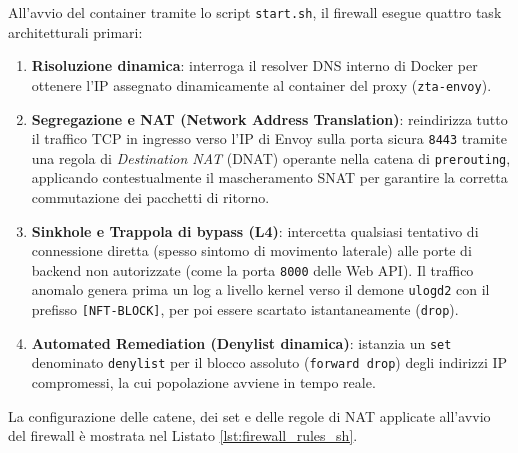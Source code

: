 All'avvio del container tramite lo script \texttt{start.sh}, il firewall esegue quattro task architetturali primari:
\begin{enumerate}
    \item \textbf{Risoluzione dinamica}: interroga il resolver DNS interno di Docker per ottenere l'IP assegnato dinamicamente al container del proxy (\texttt{zta-envoy}).
    \item \textbf{Segregazione e NAT (Network Address Translation)}: reindirizza tutto il traffico TCP in ingresso verso l'IP di Envoy sulla porta sicura \texttt{8443} tramite una regola di \textit{Destination NAT} (DNAT) operante nella catena di \texttt{prerouting}, applicando contestualmente il mascheramento SNAT per garantire la corretta commutazione dei pacchetti di ritorno.
    \item \textbf{Sinkhole e Trappola di bypass (L4)}: intercetta qualsiasi tentativo di connessione diretta (spesso sintomo di movimento laterale) alle porte di backend non autorizzate (come la porta \texttt{8000} delle Web API). Il traffico anomalo genera prima un log a livello kernel verso il demone \texttt{ulogd2} con il prefisso \texttt{[NFT-BLOCK]}, per poi essere scartato istantaneamente (\texttt{drop}).
    \item \textbf{Automated Remediation (Denylist dinamica)}: istanzia un \texttt{set} denominato \texttt{denylist} per il blocco assoluto (\texttt{forward drop}) degli indirizzi IP compromessi, la cui popolazione avviene in tempo reale.
\end{enumerate}

La configurazione delle catene, dei set e delle regole di NAT applicate all'avvio del firewall è mostrata nel Listato \ref{lst:firewall_rules_sh}.

